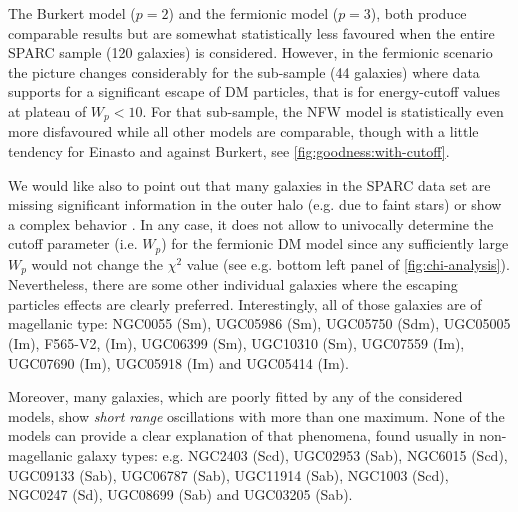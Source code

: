 \begin{asparaenum}[(i)]
%
    \item The Burkert model ($p=2$) and the fermionic model ($p=3$), both produce comparable results but are somewhat statistically less favoured when the entire SPARC sample (120 galaxies) is considered. However, in the fermionic scenario the picture changes considerably for the sub-sample (44 galaxies) where data supports for a significant escape of DM particles, that is for energy-cutoff values at plateau of $W_p < 10$. %
For that sub-sample, the NFW model is statistically even more disfavoured while all other models are comparable, though with a little tendency for Einasto and against Burkert, see \cref{fig:goodness:with-cutoff}.
\end{asparaenum}

We would like also to point out that many galaxies in the SPARC data set are missing significant information in the outer halo (e.g. due to faint stars) or show a complex behavior . In any case, it does not allow to univocally determine the cutoff parameter (i.e. $W_p$) for the fermionic DM model since any sufficiently large $W_p$ would not change the $\chi^2$ value (see e.g. bottom left panel of \cref{fig:chi-analysis}). Nevertheless, there are some other individual galaxies where the escaping particles effects are clearly preferred. Interestingly, all of those galaxies are of magellanic type: NGC0055 (Sm), UGC05986 (Sm), UGC05750 (Sdm), UGC05005 (Im), F565-V2, (Im), UGC06399 (Sm), UGC10310 (Sm), UGC07559 (Im), UGC07690 (Im), UGC05918 (Im) and UGC05414 (Im).

Moreover, many galaxies, which are poorly fitted by any of the considered models, show \textit{short range} oscillations  with more than one maximum. None of the models can provide a clear explanation of that phenomena, found usually in non-magellanic galaxy types: e.g. NGC2403 (Scd), UGC02953 (Sab), NGC6015 (Scd), UGC09133 (Sab), UGC06787 (Sab), UGC11914 (Sab), NGC1003 (Scd), NGC0247 (Sd), UGC08699 (Sab) and UGC03205 (Sab).

